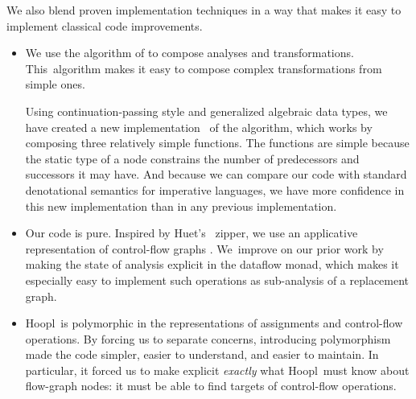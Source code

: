 \documentclass[blockstyle,preprint,natbib,nocopyrightspace]{sigplanconf}
\newcommand\ourlib{Hoopl}  %
\let\cite\citep
\def\finalremark#1{\relax}
\newcommand\delendum[1]{\relax\ifvmode\else\unskip\fi\relax}
\begin{document}
We also blend proven implementation techniques
in a way that
makes it easy
to implement classical code improvements.
\begin{itemize}
\item
We use the algorithm of \citet{lerner-grove-chambers:2002} to 
compose analyses and transformations.
This~algorithm makes it easy to compose complex transformations
from simple ones.

Using continuation-passing style and generalized algebraic data types,
we have created a new implementation%
\ifcutting\else\ of the algorithm\fi, 
which works by 
composing three relatively simple functions.
The functions are simple
because the static type of a node constrains the number of predecessors
and successors it may have.
And because we can
compare our code with standard denotational semantics for imperative
languages, we have more confidence in this new implementation than in
any previous implementation. 
\item
Our code is pure.
Inspired by Huet's~\citeyearpar{huet:zipper} zipper,
we use an applicative representation of
control-flow graphs
\cite{ramsey-dias:applicative-flow-graph}. 
We~improve on our prior work by making the state of analysis
explicit in the dataflow monad,
which
makes it especially easy to implement such
operations as sub-analysis of a replacement graph. 
\delendum{This 
last sentence is a repeat of the previous one.}
%
%
\item
\ourlib\ is polymorphic in the
representations of 
assignments and control-flow operations.
%
By forcing us to separate concerns, introducing polymorphism
made the code simpler, easier to understand, and easier to maintain.
\finalremark
{SLPJ: Is it possible to substantiate this claim by [more] examples?}
In particular, it forced us to make explicit \emph{exactly} what
\ourlib\ 
 must know about flow-graph nodes:
it must be able to find
targets of control-flow operations.
\end{itemize}
\end{document}
